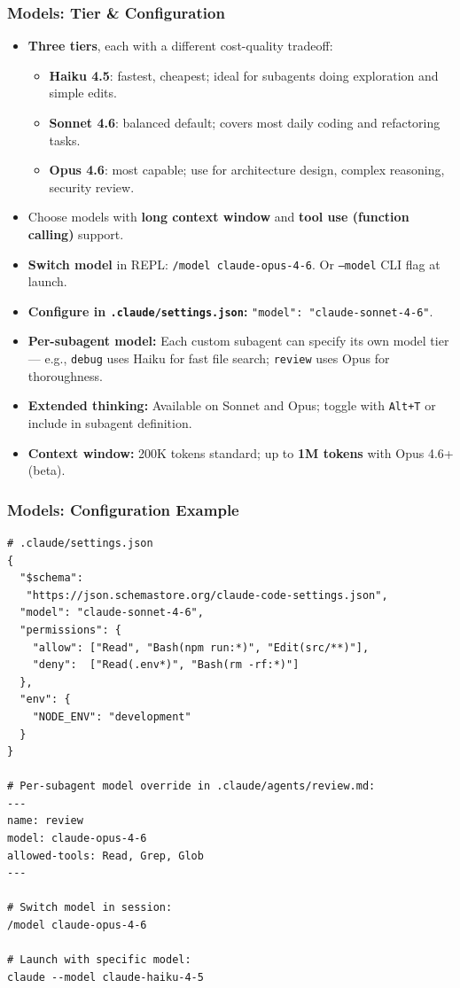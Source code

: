 \begin{frame}[fragile]\frametitle{Models: Tier \& Configuration}
  \begin{itemize}
    \item \textbf{Three tiers}, each with a different cost-quality tradeoff:
      \begin{itemize}
        \item \textbf{Haiku 4.5}: fastest, cheapest; ideal for subagents doing exploration and simple edits.
        \item \textbf{Sonnet 4.6}: balanced default; covers most daily coding and refactoring tasks.
        \item \textbf{Opus 4.6}: most capable; use for architecture design, complex reasoning, security review.
      \end{itemize}
    \item Choose models with \textbf{long context window} and \textbf{tool use (function calling)} support.
    \item \textbf{Switch model} in REPL: \texttt{/model claude-opus-4-6}. Or \texttt{--model} CLI flag at launch.
    \item \textbf{Configure in \texttt{.claude/settings.json}:} \texttt{"model": "claude-sonnet-4-6"}.
    \item \textbf{Per-subagent model:} Each custom subagent can specify its own model tier --- e.g., \texttt{debug} uses Haiku for fast file search; \texttt{review} uses Opus for thoroughness.
    \item \textbf{Extended thinking:} Available on Sonnet and Opus; toggle with \texttt{Alt+T} or include in subagent definition.
    \item \textbf{Context window:} 200K tokens standard; up to \textbf{1M tokens} with Opus 4.6+ (beta).
  \end{itemize}

\end{frame}

\begin{frame}[fragile]\frametitle{Models: Configuration Example}

\begin{lstlisting}
# .claude/settings.json
{
  "$schema":
   "https://json.schemastore.org/claude-code-settings.json",
  "model": "claude-sonnet-4-6",
  "permissions": {
    "allow": ["Read", "Bash(npm run:*)", "Edit(src/**)"],
    "deny":  ["Read(.env*)", "Bash(rm -rf:*)"]
  },
  "env": {
    "NODE_ENV": "development"
  }
}

# Per-subagent model override in .claude/agents/review.md:
---
name: review
model: claude-opus-4-6
allowed-tools: Read, Grep, Glob
---

# Switch model in session:
/model claude-opus-4-6

# Launch with specific model:
claude --model claude-haiku-4-5
\end{lstlisting}
\end{frame}
